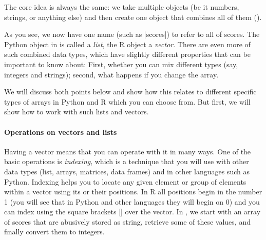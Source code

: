 
The core idea is always the same: we take multiple objects
(be it numbers, strings, or anything else) and then create one object that combines all of them ().



As you see, we now have one name (such as |scores|) to refer to all of scores.
The Python object in  is called a \emph{list}, the R object a \emph{vector}.
There are even more of such combined data types, which have slightly different
properties that can be important to know about: First, whether you can mix different
types (say, integers and strings); second, what happens if you change the array.

We will discuss both points below and show how this relates to different
specific types of arrays in Python and R which you can choose from. But first,
we will show how to work with such lists and vectors.


\paragraph{Operations on vectors and lists}
Having a vector means that you can operate with it in many ways. One of the
basic operations is \emph{indexing}, which is a technique that you will use with
other data types (list, arrays, matrices, data frames) and in other
languages such as Python.  Indexing helps you to locate any given
element or group of elements within a vector using its or their
positions. In R all positions begin in the number 1 (you will see that
in Python and other languages they will begin on 0) and you can index
using the square brackets [] over the vector. In , we
start with an array of scores that are abusively stored as string,
retrieve some of these values, and finally convert them to integers.


